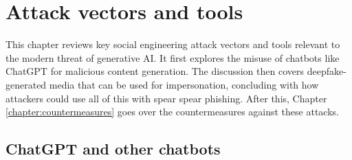 



\chapter{Attack vectors and tools \label{chapter:attacks}}
\begin{comment}

Guides:
    - About 3-4 pages

TODO:
    [ ] 

What to cover:
    - Attacks
        - Deepfake generated synthetic media
            - Videos
            - Images
            - Audio
            - Real-time voice morphing

Sections:
    - Attack Vectors and Tools
        - Chatbots
        - Deepfake-generated media
        - Phishing & spear phishing

\end{comment}

This chapter reviews key social engineering attack vectors and tools relevant to the modern threat of generative AI. It first explores the misuse of chatbots like ChatGPT for malicious content generation. The discussion then covers deepfake-generated media that can be used for impersonation, concluding with how attackers could use all of this with spear spear phishing. After this, Chapter \ref{chapter:countermeasures} goes over the countermeasures against these attacks.














\section{ChatGPT and other chatbots}

\begin{comment}

What to cover:
    - Mitä ovat chatbotit kuten ChatGPT
    - How Generative AI can be used by both cybersecurity professionals and threat actors
    - Circumventing ChatGPT's ethical restrictions with, for example prompt injections attacks or reverse psychology (with at least 1-2 examples)
    - How scholars and regular users have found ways to bypass ChatGPT's ethical restrictions??
    - Tekoälyn päivitys kun löydetään uusia tapoja ohittaa sen eettiset ohjeistukset ja kehittäjien asettamat rajoitukset
    - Pyydetään tekoälyä roolipelaamaan social engineering skenaarioita
    - Kielioppi ja kirjoitusvirheiden korjaus scam viesteissä
    
\end{comment}

